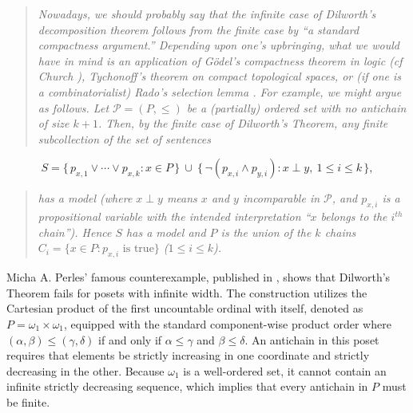 \documentclass[11pt,a4paper]{article}
\begin{document}
\begin{quote} \textit{
 Nowadays, we should probably say that the infinite case of Dilworth's decomposition theorem \cite{Dilworth1950} follows from the finite case by ``a standard compactness argument.'' Depending upon one's upbringing, what we would have in mind is an application of Gödel's compactness theorem in logic (cf Church \cite{church1956}), Tychonoff's theorem on compact topological spaces, or (if one is a combinatorialist) Rado's selection lemma \cite{rado1949axiomatic}. For example, we might argue as follows. Let $\mathcal{P} = (P,\leq)$ be a (partially) ordered set with no antichain of size $k + 1$. Then, by the finite case of Dilworth's Theorem, any finite subcollection of the set of sentences}
 \end{quote}
 \[S=\{\,p_{x,1}\vee\cdots\vee p_{x,k} : x\in P\,\}\ \cup\
   \{\,\lnot(p_{x,i}\wedge p_{y,i}) : x\perp y,\ 1\le i\le k\,\},
\]
\begin{quote}\textit{has a model (where $x \perp  y$ means $x$ and $y$ incomparable in $\mathcal{P}$, and $p_{x,i}$ is a propositional variable with the intended interpretation ``$x$ belongs to the $i^{th}$ chain''). Hence $S$ has a model and $P$ is the union of the $k$ chains $C_i = \{x \in P : p_{x,i} \mbox{ is true} \}$ ($1 \leq
i \leq k$).}
\end{quote}
 

Micha A. Perles' famous counterexample, published in \cite{perles1963dilworth},   shows that Dilworth's Theorem fails for posets with infinite width. The construction utilizes the Cartesian product of the first uncountable ordinal with itself, denoted as $P = \omega_1 \times \omega_1$, equipped with the standard component-wise product order where $(\alpha, \beta) \le (\gamma, \delta)$ if and only if $\alpha \le \gamma$ and $\beta \le \delta$. An antichain in this poset requires that elements be strictly increasing in one coordinate and strictly decreasing in the other. Because $\omega_1$ is a well-ordered set, it cannot contain an infinite strictly decreasing sequence, which implies that every antichain in $P$ must be finite. %
\end{document}

